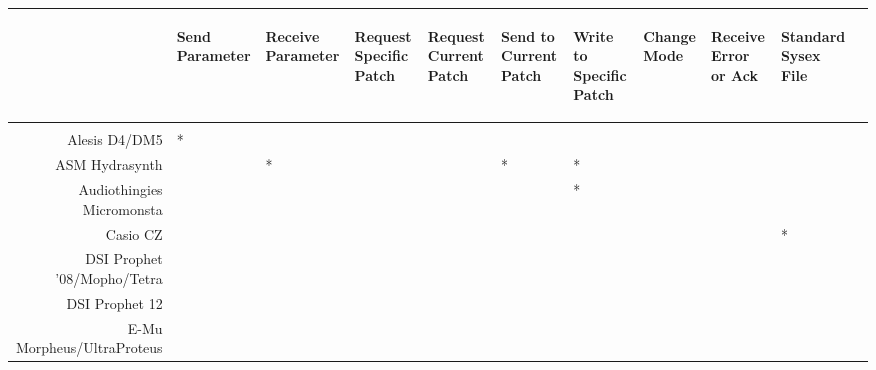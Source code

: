 \documentclass{article}
\begin{document}
\newcommand\samefootnote{\addtocounter{footnote}{-1}\footnotemark}
\newcommand\backfootnote[1]{\addtocounter{footnote}{-#1}\footnotemark\addtocounter{footnote}{#1}\addtocounter{footnote}{-1}}
\newcommand\cm{\checkmark}

\begin{table}[p]
\vspace{5em}
\begin{center}
{\footnotesize
\begin{tabular}{rllllllllll}
&
\begin{sideways}Send Parameter\end{sideways}&
\begin{sideways}Receive Parameter\end{sideways}&
\begin{sideways}Request Specific Patch\end{sideways}&
\begin{sideways}Request Current Patch\end{sideways}&
\begin{sideways}Send to Current Patch\end{sideways}&
\begin{sideways}Write to Specific Patch\end{sideways}&
\begin{sideways}Change Mode\end{sideways}&
\begin{sideways}Receive Error or Ack\end{sideways}&
\begin{sideways}Standard Sysex File\end{sideways}\\[0.5em]
\hline\\[-0.5em]
Alesis D4/DM5&{\cm}*&&{\cm}&&{\cm}&{\cm}& & &{\cm}            \\
ASM Hydrasynth&{\cm}&{\cm}*&\cm&&{\cm}*&{\cm}*& & &{\cm}            \\
Audiothingies Micromonsta&{\cm}&{\cm}&&&&{\cm}*& & &{\cm}            \\
Casio CZ&&&{\cm}&{\cm}&{\cm}&{\cm}& & &{\cm}*            \\
DSI Prophet '08/Mopho/Tetra&{\cm}&{\cm}&{\cm}&{\cm}&{\cm}&{\cm}& & &{\cm}            \\
DSI Prophet 12&{\cm}&{\cm}&{\cm}&{\cm}&{\cm}&{\cm}& & &{\cm}            \\
E-Mu Morpheus/UltraProteus&{\cm}& &{\cm}& & &{\cm}& & &{\cm}            \\

\end{tabular}}
\end{center}
\end{table}
\end{document}

